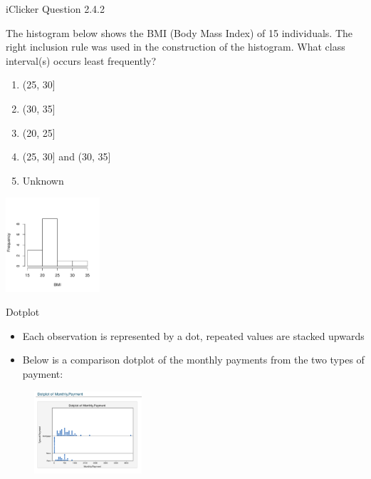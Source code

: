 \documentclass[14pt]{beamer}\usepackage[]{graphicx}\usepackage[]{color}
\begin{document}
\begin{frame}[fragile]{iClicker Question 2.4.2}

{\small{
The histogram below shows the BMI (Body Mass Index) of 15  individuals. The right inclusion rule was used in the construction of the  histogram. What class interval(s) occurs least frequently?
}}

\begin{minipage}[ht]{5cm}

{\small{
\begin{enumerate}
\item (25, 30]
\item (30, 35]
\item (20, 25]
\item (25, 30] and (30, 35]
\item Unknown
\end{enumerate}
}}
\end{minipage} \hfill
\begin{minipage}[ht]{6cm}


\includegraphics[width=3.5cm]{figure/LBL2f-1} 

\end{minipage}

\end{frame}

\begin{frame}[fragile]{Dotplot}

\begin{itemize}
\item Each observation is represented by a dot, repeated values are  stacked
upwards
\item Below is a comparison dotplot of the monthly payments from the two  types of payment:
\end{itemize}

\begin{figure}[htbp]
   \centering
   \includegraphics[width=4cm]{chapters/chapter2/ext_figure/dotchart.png} %
\end{figure}
\end{frame}
\end{document}
